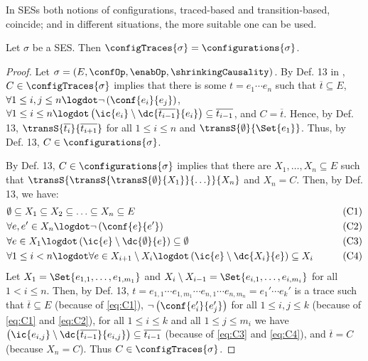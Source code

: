 \documentclass[runningheads,a4paper]{llncs}
\begin{document}
In SESs both notions of configurations, traced-based and transition-based,
coincide; and in different situations, the more suitable one can be used.

\begin{lemma}\label{lem:SESconf}
	Let $ \sigma $ be a SES. Then $ \configTraces{\sigma} = \configurations{\sigma} $.
\end{lemma}

\begin{proof}
	Let $ \sigma = \left( E, \confOp, \enabOp, \shrinkingCausality \right) $.	By Def. 13 in \cite{dynamicCausality15}, $ C \in \configTraces{\sigma} $ implies that there is some $ t = e_1 \cdots e_n $ such that $ \overline{t} \subseteq E $, $ \forall 1 \leq i, j \leq n \logdot \neg \left( \conf{e_i}{e_j} \right) $, $ \forall 1 \leq i \leq n \logdot \left( \ic{e_i} \setminus \dc{\overline{t_{i - 1}}}{e_i} \right) \subseteq \overline{t_{i - 1}} $, and $ C = \overline{t} $.	Hence, by Def. 13, $ \transS{\overline{t_i}}{\overline{t_{i + 1}}} $ for all $ 1 \leq i \leq n $ and $ \transS{\emptyset}{\Set{ e_1 }} $.	Thus, by Def. 13, $ C \in \configurations{\sigma} $.
	
	By Def. 13, $ C \in \configurations{\sigma} $ implies that there are $ X_1, \ldots, X_n \subseteq E $ such that $ \transS{\transS{\transS{\emptyset}{X_1}}{\ldots}}{X_n} $ and $ X_n = C $.
	Then, by Def. 13, we have:
	\begin{align}
		& \emptyset \subseteq X_1 \subseteq X_2 \subseteq \ldots \subseteq X_n \subseteq E & \tag{C1} \label{eq:C1}\\
		& \forall e, e' \in X_n \logdot \neg \left( \conf{e}{e'} \right) & \tag{C2} \label{eq:C2}\\
		& \forall e \in X_1 \logdot \left( \ic{e} \setminus \dc{\emptyset}{e} \right) \subseteq \emptyset & \tag{C3} \label{eq:C3}\\
		& \forall 1 \leq i < n \logdot \forall e \in X_{i + 1} \setminus X_i \logdot \left( \ic{e} \setminus \dc{X_i}{e} \right) \subseteq X_i & \tag{C4} \label{eq:C4}
	\end{align}
	Let $ X_1 = \Set{ e_{1, 1}, \ldots, e_{1, m_1} } $ and $ X_i \setminus X_{i - 1} = \Set{ e_{i, 1}, \ldots, e_{i, m_i} } $ for all $ 1 < i \leq n $.	Then, by Def. 13, $ t = e_{1, 1} \cdots e_{1, m_1} \cdots e_{n, 1} \cdots e_{n, m_n} = e_1' \cdots e_k' $ is a trace such that $ \overline{t} \subseteq E $ (because of \eqref{eq:C1}), $ \neg \left( \conf{e_i'}{e_j'} \right) $ for all $ 1 \leq i, j \leq k $ (because of \eqref{eq:C1} and \eqref{eq:C2}), for all $ 1 \leq i \leq k $ and all $ 1 \leq j \leq m_i $ we have $ \left( \ic{e_{i, j}} \setminus \dc{\overline{t_{i - 1}}}{e_{i, j}} \right) \subseteq \overline{t_{i - 1}} $ (because of \eqref{eq:C3} and \eqref{eq:C4}), and $ \overline{t} = C $ (because $ X_n = C $).
	Thus $ C \in \configTraces{\sigma} $.
\end{proof}
\end{document}
